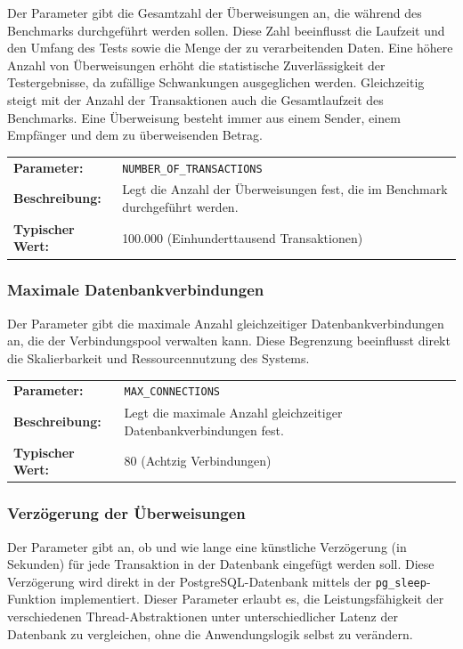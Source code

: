 \documentclass[fontsize=12pt,paper=a4,twoside=semi,parskip=half-,headsepline,headinclude]{scrreprt}
\begin{document}
Der Parameter gibt die Gesamtzahl der Überweisungen an, die während des Benchmarks durchgeführt werden sollen. Diese Zahl beeinflusst die Laufzeit und den Umfang des Tests sowie die Menge der zu verarbeitenden Daten. Eine höhere Anzahl von Überweisungen erhöht die statistische Zuverlässigkeit der Testergebnisse, da zufällige Schwankungen ausgeglichen werden. Gleichzeitig steigt mit der Anzahl der Transaktionen auch die Gesamtlaufzeit des Benchmarks. Eine Überweisung besteht immer aus einem Sender, einem Empfänger und dem zu überweisenden Betrag. 

\begin{tabularx}{\textwidth}{@{}lX@{}}
	\textbf{Parameter:} & \texttt{NUMBER\_OF\_TRANSACTIONS} \\
	\textbf{Beschreibung:} & Legt die Anzahl der Überweisungen fest, die im Benchmark durchgeführt werden. \\
	\textbf{Typischer Wert:} & 100.000 (Einhunderttausend Transaktionen)
\end{tabularx}

\subsubsection{Maximale Datenbankverbindungen}

Der Parameter gibt die maximale Anzahl gleichzeitiger Datenbankverbindungen an, die der Verbindungspool verwalten kann. Diese Begrenzung beeinflusst direkt die Skalierbarkeit und Ressourcennutzung des Systems.

\begin{tabularx}{\textwidth}{@{}lX@{}}
	\textbf{Parameter:} & \texttt{MAX\_CONNECTIONS} \\
	\textbf{Beschreibung:} & Legt die maximale Anzahl gleichzeitiger Datenbankverbindungen fest. \\
	\textbf{Typischer Wert:} & 80 (Achtzig Verbindungen)
\end{tabularx}

\subsubsection{Verzögerung der Überweisungen}

Der Parameter gibt an, ob und wie lange eine künstliche Verzögerung (in Sekunden) für jede Transaktion in der Datenbank eingefügt werden soll. Diese Verzögerung wird direkt in der PostgreSQL-Datenbank mittels der \texttt{pg\_sleep}-Funktion implementiert. Dieser Parameter erlaubt es, die Leistungsfähigkeit der verschiedenen Thread-Abstraktionen unter unterschiedlicher Latenz der Datenbank zu vergleichen, ohne die Anwendungslogik selbst zu verändern.
\end{document}
